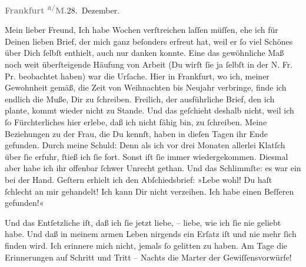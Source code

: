\pstart
           \raggedleft{}\textcolor{gray}{\textbf{Frankfurt \textsuperscript{a/}M.}}28. Dezember.\pend
           
\pstart{}Mein lieber Freund,\pend\vspace{0.5em}
\pstart
           Ich habe Wochen verſtreichen laſſen müſſen, ehe ich für Deinen lieben Brief, der mich
               ganz beſonders erfreut hat, weil er{ }ſo viel Schönes über Dich{ }ſelbſt enthielt, auch
               nur danken konnte. Eine das gewöhnliche Maß noch weit überſteigende Häufung von
               Arbeit (Du wirſt{ }ſie ja{ }ſelbſt in der N. Fr. Pr.
               beobachtet haben) war die Urſache. Hier in Frankfurt, wo ich, meiner Gewohnheit gemäß, die Zeit von Weihnachten bis Neujahr
               verbringe, finde ich endlich die {\pb}Muße, Dir zu{ }ſchreiben. Freilich, der ausführliche Brief, den ich plante, kommt wieder nicht zu
               Stande. Und das geſchieht deshalb nicht, weil ich{ }ſo Fürchterliches hier erlebe, daß
               ich nicht fähig bin, zu{ }ſchreiben. Meine Beziehungen zu der Frau, die Du kennſt, haben in dieſen Tagen
               ihr Ende gefunden. Durch meine Schuld: Denn als ich vor drei Monaten allerlei Klatſch
               über{ }ſie erfuhr,{ }ſtieß ich{ }ſie fort. Sonst iſt{ }ſie immer wiedergekommen. Diesmal aber
               habe ich ihr offenbar{ }ſchwer Unrecht gethan. Und das Schlimmſte: es war ein \label{K_L03231-1v}\label{K_L03231-1} bei der Hand.
                  Geſtern erhielt ich den Abſchiedsbrief: »Lebe wohl!
               Du haſt{ }ſchlecht an mir gehandelt! Ich kann Dir nicht verzeihen. Ich habe einen Beſſeren gefunden!«\pend
           
\pstart
           Und das Entſetzliche iſt, daß ich{ }ſie jetzt liebe, – liebe, wie ich{ }ſie nie geliebt
               habe. Und daß in meinem armen Leben nirgends ein Erſatz iſt und nie mehr{ }ſich finden
               wird. Ich erinnere mich nicht, jemals{ }ſo gelitten zu haben. Am Tage die Erinnerungen
               auf Schritt und Tritt – Nachts die Marter {\pb}der
               Gewiſſensvorwürfe!\pend
           
